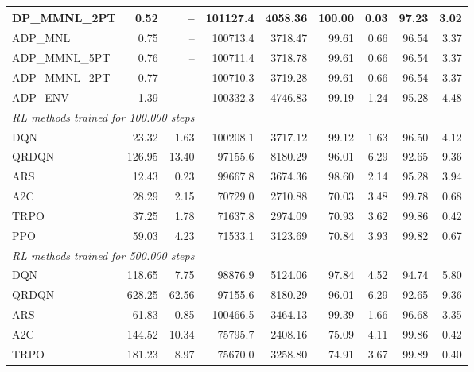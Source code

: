 \begin{samepage}
\begin{center}
\begin{tabular}{l|rr|rr|rr|rr}
    DP\_MMNL\_2PT &     0.52 &    -- &   101127.4 &    4058.36 &  100.00 &    0.03 &   97.23 &    3.02 \\
    \midrule
    ADP\_MNL     &     0.75 &    -- &   100713.4 &    3718.47 &   99.61 &    0.66 &   96.54 &    3.37 \\
    ADP\_MMNL\_5PT &     0.76 &    -- &   100711.4 &    3718.78 &   99.61 &    0.66 &   96.54 &    3.37 \\
    ADP\_MMNL\_2PT &     0.77 &    -- &   100710.3 &    3719.28 &   99.61 &    0.66 &   96.54 &    3.37 \\
    ADP\_ENV     &     1.39 &    -- &   100332.3 &    4746.83 &   99.19 &    1.24 &   95.28 &    4.48 \\
    \midrule
    \multicolumn{9}{l}{\textit{RL methods trained for 100.000 steps}} \\
    \midrule
    DQN          &    23.32 &     1.63 &   100208.1 &    3717.12 &   99.12 &    1.63 &   96.50 &    4.12 \\
    QRDQN        &   126.95 &    13.40 &    97155.6 &    8180.29 &   96.01 &    6.29 &   92.65 &    9.36 \\
    ARS          &    12.43 &     0.23 &    99667.8 &    3674.36 &   98.60 &    2.14 &   95.28 &    3.94 \\
    A2C          &    28.29 &     2.15 &    70729.0 &    2710.88 &   70.03 &    3.48 &   99.78 &    0.68 \\
    TRPO         &    37.25 &     1.78 &    71637.8 &    2974.09 &   70.93 &    3.62 &   99.86 &    0.42 \\
    PPO          &    59.03 &     4.23 &    71533.1 &    3123.69 &   70.84 &    3.93 &   99.82 &    0.67 \\
    \midrule
    \multicolumn{9}{l}{\textit{RL methods trained for 500.000 steps}} \\
    \midrule
    DQN          &   118.65 &     7.75 &    98876.9 &    5124.06 &   97.84 &    4.52 &   94.74 &    5.80 \\
    QRDQN        &   628.25 &    62.56 &    97155.6 &    8180.29 &   96.01 &    6.29 &   92.65 &    9.36 \\
    ARS          &    61.83 &     0.85 &   100466.5 &    3464.13 &   99.39 &    1.66 &   96.68 &    3.35 \\
    A2C          &   144.52 &    10.34 &    75795.7 &    2408.16 &   75.09 &    4.11 &   99.86 &    0.42 \\
    TRPO         &   181.23 &     8.97 &    75670.0 &    3258.80 &   74.91 &    3.67 &   99.89 &    0.40 \\

\end{tabular}
\end{center}
\end{samepage}

